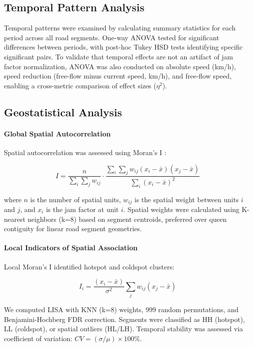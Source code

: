 \documentclass[review,authoryear]{elsarticle}
\begin{document}
\subsection{Temporal Pattern Analysis}

Temporal patterns were examined by calculating summary statistics for each period across all road segments. One-way ANOVA tested for significant differences between periods, with post-hoc Tukey HSD tests identifying specific significant pairs. To validate that temporal effects are not an artifact of jam factor normalization, ANOVA was also conducted on absolute speed (km/h), speed reduction (free-flow minus current speed, km/h), and free-flow speed, enabling a cross-metric comparison of effect sizes ($\eta^2$).

\subsection{Geostatistical Analysis}

\paragraph{Global Spatial Autocorrelation}

Spatial autocorrelation was assessed using Moran's I \citep{Moran1950}:

\[I = \frac{n}{\sum_i \sum_j w_{ij}} \cdot \frac{\sum_i \sum_j w_{ij}(x_i - \bar{x})(x_j - \bar{x})}{\sum_i (x_i - \bar{x})^2}\]

where $n$ is the number of spatial units, $w_{ij}$ is the spatial weight between units $i$ and $j$, and $x_i$ is the jam factor at unit $i$. Spatial weights were calculated using K-nearest neighbors (k=8) based on segment centroids, preferred over queen contiguity for linear road segment geometries.

\paragraph{Local Indicators of Spatial Association}

Local Moran's I \citep{Anselin1995} identified hotspot and coldspot clusters:

\[I_i = \frac{(x_i - \bar{x})}{\sigma^2} \sum_j w_{ij}(x_j - \bar{x})\]

We computed LISA with KNN (k=8) weights, 999 random permutations, and Benjamini-Hochberg FDR correction. Segments were classified as HH (hotspot), LL (coldspot), or spatial outliers (HL/LH). Temporal stability was assessed via coefficient of variation: $CV = (\sigma/\mu) \times 100\%$.
\end{document}
